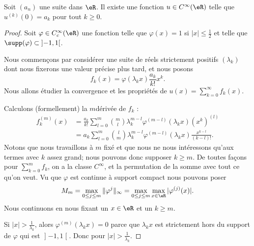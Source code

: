 \begin{lemma} \label{LemRENlIEL}
    Soit \( (a_n)\) une suite dans \( \eR\). Il existe une fonction \( u\in C^{\infty}(\eR)\) telle que \( u^{(k)}(0)=a_k\) pour tout \( k\geq 0\).
\end{lemma}

\begin{proof}
    Soit \( \varphi\in C^{\infty}_c(\eR)\) une fonction telle que \( \varphi(x)=1\) si \( | x |\leq \frac{ 1 }{2}\) et telle que \( \supp(\varphi)\subset\mathopen] -1 , 1 \mathclose[\).

    Nous commençons par considérer une suite de réels strictement positifs \( (\lambda_k)\) dont nous fixerons une valeur précise plus tard, et nous posons
    \begin{equation}
        f_k(x)=\varphi(\lambda_k x)\frac{ a_k }{ k! }x^k.
    \end{equation}
    Nous allons étudier la convergence et les propriétés de \( u(x)=\sum_{k=0}^{\infty}f_k(x)\).

    Calculons (formellement) la \( m\)\ieme dérivée de \( f_k\) :
    \begin{subequations}
        \begin{align}
            f_k^{(m)}(x)&=\frac{ a_k }{ k! }\sum_{l=0}^{m}\binom{ m }{ l }\lambda_k^{m-l}\varphi^{(m-l)}(\lambda_kx)(x^k)^{(l)}\\
            &=a_k\sum_{l=0}^{m}\binom{ l }{ m }\lambda_k^{m-l}\varphi^{(m-l)}(\lambda_kx)\frac{ x^{k-l} }{ (k-l)! }.
        \end{align}
    \end{subequations}
    Notons que nous travaillons à \( m\) fixé et que nous ne nous intéressons qu'aux termes avec \( k\) assez grand; nous pouvons donc supposer \( k\geq m\). De toutes façons pour \( \sum_{k=0}^mf_k\), on a la classe \(  C^{\infty}\), et la permutation de la somme avec tout ce qu'on veut. Vu que \( \varphi\) est continue à support compact nous pouvons poser
    \begin{equation}
        M_m=\max_{0\leq j\leq m}\| \varphi^{j} \|_{\infty}=\max_{0\leq j\leq m}\max_{x\in \eR}| \varphi^{(j)}(x) |.
    \end{equation}
    Nous continuons en nous fixant un \( x\in \eR\) et un \( k\geq m\).

    Si \( | x |>\frac{1}{ \lambda_k }\), alors \( \varphi^{(m)}(\lambda_kx)=0\) parce que \( \lambda_kx\) est strictement hors du support de \( \varphi\) qui est \( \mathopen] -1 , 1 \mathclose[\). Donc pour \( | x |>\frac{1}{ \lambda_k }\).


\end{proof}
